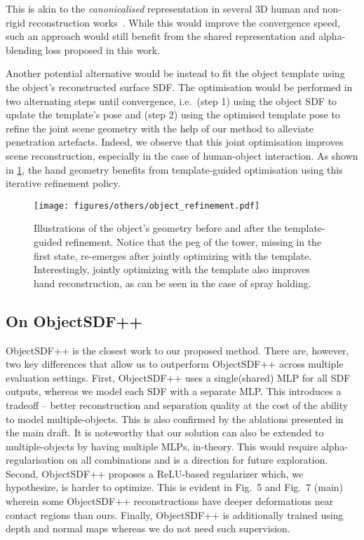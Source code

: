 This is akin to the \textit{canonicalised} representation in several 3D human and non-rigid reconstruction works~\cite{pumarola2020d, liu2021neuralactor, tretschk2021nonrigid, peng2021neuralbody}. 
While this would improve the convergence speed, such an approach would still benefit from the shared representation and alpha-blending loss proposed in this work. 
\par
Another potential alternative would be instead to fit the object template using the object's reconstructed surface SDF. 
The optimisation would be performed in two alternating steps until convergence, i.e.~(step 1) using the object SDF to update the template's pose and (step 2) using the optimised template pose to refine the joint scene geometry with the help of our method to alleviate penetration artefacts. 
Indeed, we observe that this joint optimisation improves scene reconstruction, especially in the case of human-object interaction. 
As shown in \cref{fig:object_refinement}, the hand geometry benefits from template-guided optimisation using this iterative refinement policy.
\begin{figure}
    \centering  
    \texttt{[image: figures/others/object\_refinement.pdf]}
    \label{fig:object_refinement}
    \caption{Illustrations of the object's geometry before and after the template-guided refinement. Notice that the peg of the tower, missing in the first state, re-emerges after jointly optimizing with the template. Interestingly, jointly optimizing with the template also improves hand reconstruction, as can be seen in the case of spray holding.}
    \vspace{-1em}
\end{figure}
\par
\subsection{On ObjectSDF++}
\label{sec:on_objectsdf++}
ObjectSDF++ is the closest work to our proposed method. 
There are, however, two key differences that allow us to outperform ObjectSDF++ across multiple evaluation settings.
First, ObjectSDF++ uses a single(shared) MLP for all SDF outputs, whereas we model each SDF with a separate MLP. 
This introduces a tradeoff -- better reconstruction and separation quality at the cost of the ability to model multiple-objects. 
This is also confirmed by the ablations presented in the main draft. 
It is noteworthy that our solution can also be extended to multiple-objects by having multiple MLPs, in-theory. 
This would require alpha-regularisation on all combinations and is a direction for future exploration.
Second, ObjectSDF++ proposes a ReLU-based regularizer which, we hypothesize, is harder to optimize. 
This is evident in Fig.~5 and Fig.~7 (main) wherein some ObjectSDF++ reconstructions have deeper deformations near contact regions than ours.
Finally, ObjectSDF++ is additionally trained using depth and normal maps whereas we do not need such supervision.

